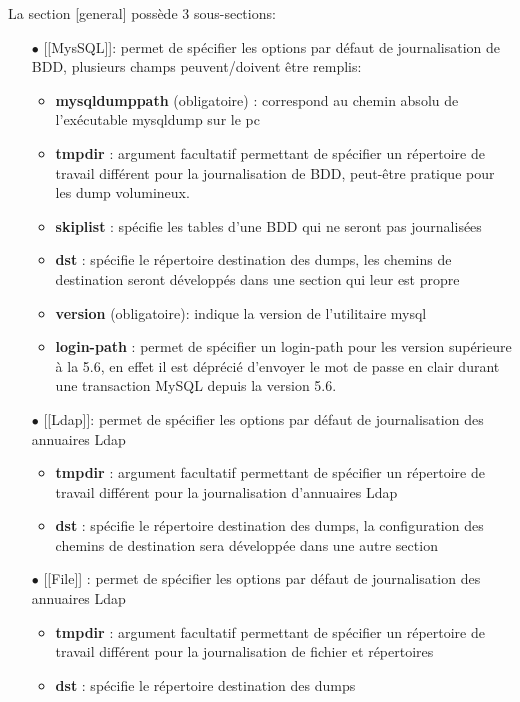 La section [general] possède 3 sous-sections:
\begin{itemize}
\item[$\bullet$] [[MysSQL]]: permet de spécifier les options par défaut de journalisation de BDD, plusieurs champs peuvent/doivent être remplis:
\begin{itemize}
\item \textbf{mysqldumppath} (obligatoire) : correspond au chemin absolu de l'exécutable mysqldump sur le pc
\item \textbf{tmpdir} : argument facultatif permettant de spécifier un répertoire de travail différent pour la journalisation de BDD, peut-être pratique pour les dump volumineux.
\item \textbf{skiplist} : spécifie les tables d'une BDD qui ne seront pas journalisées
\item \textbf{dst} : spécifie le répertoire destination des dumps, les chemins de destination seront développés dans une section qui leur est propre
\item \textbf{version} (obligatoire): indique la version de l'utilitaire mysql
\item \textbf{login-path} : permet de spécifier un login-path pour les version supérieure à  la 5.6, en effet il est déprécié d'envoyer le mot de passe en clair durant une transaction MySQL depuis la version 5.6.
\end{itemize}
\item[$\bullet$] [[Ldap]]: permet de spécifier les options par défaut de journalisation des annuaires Ldap
\begin{itemize}
\item \textbf{tmpdir} :  argument facultatif permettant de spécifier un répertoire de travail différent pour la journalisation d'annuaires Ldap
\item \textbf{dst} : spécifie le répertoire destination des dumps, la configuration des chemins de destination sera développée dans une autre section
\end{itemize} 
\item[$\bullet$][[File]] : permet de spécifier les options par défaut de journalisation des annuaires Ldap
\begin{itemize}
\item \textbf{tmpdir} :  argument facultatif permettant de spécifier un répertoire de travail différent pour la journalisation de fichier et répertoires
\item \textbf{dst} : spécifie le répertoire destination des dumps
\end{itemize}
\end{itemize}

